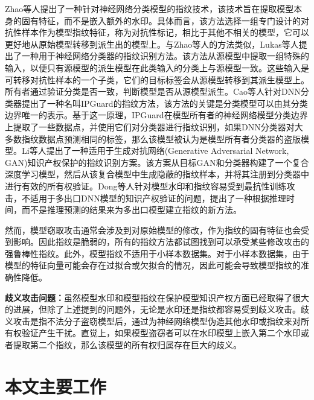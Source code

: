 Zhao等人\cite{zhao2020afa}提出了一种针对神经网络分类模型的指纹技术，该技术旨在提取模型本身的固有特征，而不是嵌入额外的水印。具体而言，该方法选择一组专门设计的对抗性样本作为模型指纹特征，称为对抗性标记，相比于其他不相关的模型，它可以更好地从原始模型转移到派生出的模型上。与Zhao等人\cite{zhao2020afa}的方法类似，Lukas等人\cite{lukas2019deep}提出了一种用于神经网络分类器的指纹识别方法。该方法从源模型中提取一组特殊的输入，以便只有源模型的派生模型在此类输入的分类上与源模型一致。这些输入是可转移对抗性样本的一个子类，它们的目标标签会从源模型转移到其派生模型上。所有者通过验证分类是否一致，判断模型是否从源模型派生。Cao等人\cite{cao2021ipguard}针对DNN分类器提出了一种名叫IPGuard的指纹方法，该方法的关键是分类模型可以由其分类边界唯一的表示。基于这一原理，IPGuard在模型所有者的神经网络模型分类边界上提取了一些数据点，并使用它们对分类器进行指纹识别，如果DNN分类器对大多数指纹数据点预测相同的标签，那么该模型被认为是模型所有者分类器的盗版模型。Li等人\cite{li2021novel}提出了一种适用于生成对抗网络(Generative Adversarial Network, GAN)\cite{goodfellow2020generative}知识产权保护的指纹识别方案。该方案从目标GAN和分类器构建了一个复合深度学习模型，然后从该复合模型中生成隐蔽的指纹样本，并将其注册到分类器中进行有效的所有权验证。Dong等人\cite{dong2021fingerprinting}针对模型水印和指纹容易受到最抗性训练攻击，不适用于多出口DNN模型的知识产权验证的问题，提出了一种根据推理时间，而不是推理预测的结果来为多出口模型建立指纹的新方法。

然而，模型窃取攻击通常会涉及到对原始模型的修改，作为指纹的固有特征也会受到影响。因此指纹是脆弱的，所有的指纹方法都试图找到可以承受某些修改攻击的强鲁棒性指纹。此外，模型指纹不适用于小样本数据集。对于小样本数据集，由于模型的特征向量可能会存在过拟合或欠拟合的情况，因此可能会导致模型指纹的准确性降低。

\textbf{歧义攻击问题：}虽然模型水印和模型指纹在保护模型知识产权方面已经取得了很大的进展，但除了上述提到的问题外，无论是水印还是指纹都容易受到歧义攻击\cite{fan2019rethinking,li2019piracy}。歧义攻击是指不法分子盗窃模型后，通过为神经网络模型伪造其他水印或指纹来对所有权验证产生干扰。直觉上，如果模型盗窃者可以在水印模型上嵌入第二个水印或者提取第二个指纹，那么该模型的所有权归属存在巨大的歧义。


\section{本文主要工作}

